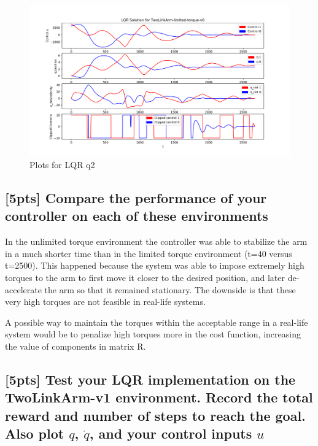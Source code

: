 \documentclass{article}
\begin{document}
\begin{figure}[H] \label{fig:lqr_qn2}
  \centering
  \includegraphics[width=1.2\textwidth]{images/lqr_qn2}
  \caption{Plots for LQR q2}
\end{figure}

\subsection{[5pts] Compare the performance of your controller on each of these environments}

In the unlimited torque environment the controller was able to stabilize the arm in a much shorter time than in the limited torque environment (t=40 versus t=2500). This happened because the system was able to impose extremely high torques to the arm to first move it closer to the desired position, and later de-accelerate the arm so that it remained stationary. The downside is that these very high torques are not feasible in real-life systems. 

A possible way to maintain the torques within the acceptable range in a real-life system would be to penalize high torques more in the cost function, increasing the value of components in matrix R.


\subsection{[5pts] Test your LQR implementation on the TwoLinkArm-v1 environment. Record the total reward and number of steps to reach the goal. Also plot $q$, $\dot{q}$, and your control inputs $u$}
\end{document}
